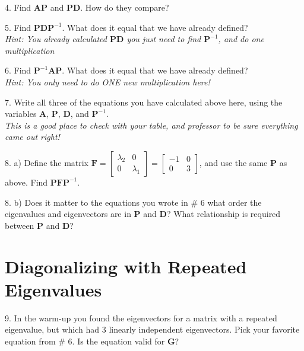 \documentclass{article}
\begin{document}
\begin{flushleft}
\vspace{0.2in}

4. Find $\textbf{AP}$ and $\textbf{PD}$. How do they compare?

\vspace{2.5in}

5. Find $\textbf{PDP}^{-1}$. What does it equal that we have already defined? \\
\textit{Hint: You already calculated $\textbf{PD}$ you just need to find $\textbf{P}^{-1}$, and do one multiplication}

\vspace{2.5in}

6. Find $\textbf{P}^{-1} \textbf{AP}$. What does it equal that we have already defined?\\
\textit{Hint: You only need to do ONE new multiplication here!}

\vspace{2in}

7. Write all three of the equations you have calculated above here, using the variables \textbf{A}, \textbf{P}, \textbf{D}, and $\textbf{P}^{-1}$. \\
\textit{This is a good place to check with your table, and professor to be sure everything came out right!}

\vspace{1in}

8. a) Define the matrix $\textbf{F}=\begin{bmatrix} \lambda_2 & 0 \\ 0 & \lambda_1 \end{bmatrix} = \begin{bmatrix} -1 & 0 \\ 0 & 3 \end{bmatrix}$, and use the same \textbf{P} as above. Find $\textbf{PFP}^{-1}$. 

\vspace{2.5in}

8. b) Does it matter to the equations you wrote in \# 6 what order the eigenvalues and eigenvectors are in \textbf{P} and \textbf{D}? What relationship is required between \textbf{P} and \textbf{D}?

\vspace{1in}

\section*{Diagonalizing with Repeated Eigenvalues}
9. In the warm-up you found the eigenvectors for a matrix with a repeated eigenvalue, but which had 3 linearly independent eigenvectors. Pick your favorite equation from \# 6. Is the equation valid for \textbf{G}?


\end{flushleft}
\end{document}
